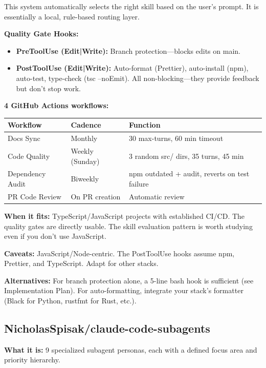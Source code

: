 \documentclass[11pt,a4paper]{article}
\begin{document}
This system automatically selects the right skill based on the user's prompt. It is essentially a local, rule-based routing layer.

\textbf{Quality Gate Hooks:}
\begin{itemize}
  \item \textbf{PreToolUse (Edit|Write):} Branch protection---blocks edits on main.
  \item \textbf{PostToolUse (Edit|Write):} Auto-format (Prettier), auto-install (npm), auto-test, type-check (tsc --noEmit). All non-blocking---they provide feedback but don't stop work.
\end{itemize}

\textbf{4 GitHub Actions workflows:}

\begin{tabularx}{\textwidth}{l l X}
\toprule
\textbf{Workflow} & \textbf{Cadence} & \textbf{Function} \\
\midrule
Docs Sync & Monthly & 30 max-turns, 60 min timeout \\
Code Quality & Weekly (Sunday) & 3 random src/ dirs, 35 turns, 45 min \\
Dependency Audit & Biweekly & npm outdated + audit, reverts on test failure \\
PR Code Review & On PR creation & Automatic review \\
\bottomrule
\end{tabularx}

\textbf{When it fits:} TypeScript/JavaScript projects with established CI/CD. The quality gates are directly usable. The skill evaluation pattern is worth studying even if you don't use JavaScript.

\textbf{Caveats:} JavaScript/Node-centric. The PostToolUse hooks assume npm, Prettier, and TypeScript. Adapt for other stacks.

\textbf{Alternatives:} For branch protection alone, a 5-line bash hook is sufficient (see Implementation Plan). For auto-formatting, integrate your stack's formatter (Black for Python, rustfmt for Rust, etc.).

\subsection{NicholasSpisak/claude-code-subagents}

\textbf{What it is:} 9 specialized subagent personas, each with a defined focus area and priority hierarchy.
\end{document}
